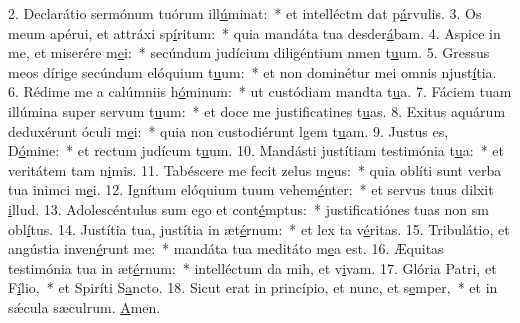 2. Declarátio sermónum tuórum ill\uline{ú}minat:~* et intelléctm dat p\uline{á}rvulis.
3. Os meum apérui, et attráxi sp\uline{í}ritum:~* quia mandáta tua desder\uline{á}bam.
4. Aspice in me, et miserére m\uline{e}i:~* secúndum judícium diligéntium nmen t\uline{u}um.
5. Gressus meos dírige secúndum elóquium t\uline{u}um:~* et non dominétur mei omnis njust\uline{í}tia.
6. Rédime me a calúmniis h\uline{ó}minum:~* ut custódiam mandta t\uline{u}a.
7. Fáciem tuam illúmina super servum t\uline{u}um:~* et doce me justificatines t\uline{u}as.
8. Exitus aquárum deduxérunt óculi m\uline{e}i:~* quia non custodiérunt lgem t\uline{u}am.
9. Justus es, D\uline{ó}mine:~* et rectum judícum t\uline{u}um.
10. Mandásti justítiam testimónia t\uline{u}a:~* et veritátem tam n\uline{i}mis.
11. Tabéscere me fecit zelus m\uline{e}us:~* quia oblíti sunt verba tua inimci m\uline{e}i.
12. Ignítum elóquium tuum vehem\uline{é}nter:~* et servus tuus dilxit \uline{i}llud.
13. Adolescéntulus sum ego et cont\uline{é}mptus:~* justificatiónes tuas non sm obl\uline{í}tus.
14. Justítia tua, justítia in æt\uline{é}rnum:~* et lex ta v\uline{é}ritas.
15. Tribulátio, et angústia inven\uline{é}runt me:~* mandáta tua meditáto m\uline{e}a est.
16. Æquitas testimónia tua in æt\uline{é}rnum:~* intelléctum da mih, et v\uline{i}vam.
17. Glória Patri, et F\uline{í}lio,~* et Spiríti S\uline{a}ncto.
18. Sicut erat in princípio, et nunc, et s\uline{e}mper,~* et in sǽcula sæculrum. \uline{A}men.
